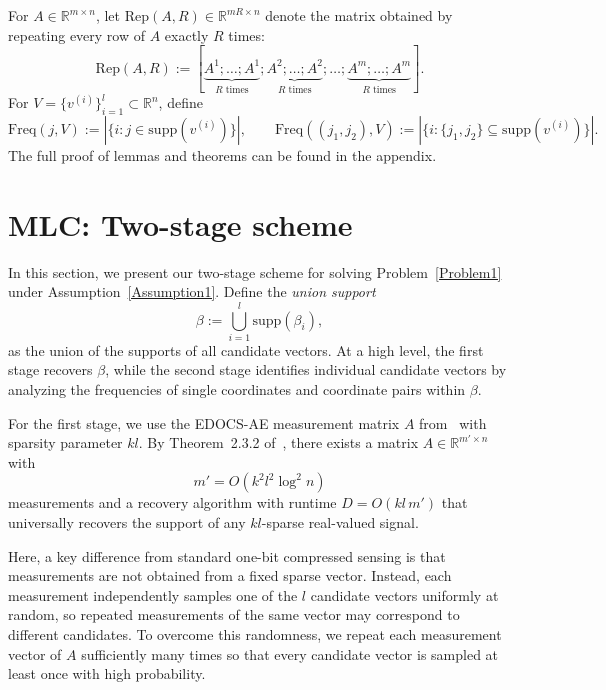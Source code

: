 \documentclass[10pt,a4paper]{amsart}
\newcommand{\xl}[1]{{\color{blue}#1}}
\newcommand{\supp}{\mathrm{supp}}
\begin{document}
For $A\in\mathbb{R}^{m\times n}$, let $\mathrm{Rep}(A,R)\in\mathbb{R}^{mR\times n}$ denote the matrix obtained by repeating every row of $A$ exactly $R$ times:
\[
\mathrm{Rep}(A,R)
:=
[\underbrace{A^1;\dots;A^1}_{R\text{ times}};
\underbrace{A^2;\dots;A^2}_{R\text{ times}};
\dots;
\underbrace{A^m;\dots;A^m}_{R\text{ times}}].
\]
For $V=\{v^{(i)}\}_{i=1}^l\subset\mathbb{R}^n$, define
\[
\mathrm{Freq}(j,V):=
|\{i:j\in\supp(v^{(i)})\}|,
\qquad
\mathrm{Freq}((j_1,j_2),V):=
|\{i:\{j_1,j_2\}\subseteq\supp(v^{(i)})\}|.
\]
The full proof of lemmas and theorems can be found in the appendix.

%




\section{MLC: Two-stage scheme}\label{sec:2SUMLC} 
In this section, we present our two-stage scheme for solving Problem~\ref{Problem1} under Assumption~\ref{Assumption1}. Define the \emph{union support}
\[
\beta:=\bigcup_{i=1}^{l}\supp(\beta_i),
\]
as the union of the supports of all candidate vectors. At a high level, the first stage recovers $\beta$, while the second stage identifies individual candidate vectors by analyzing the frequencies of single coordinates and coordinate pairs within $\beta$.

For the first stage, we use the EDOCS-AE measurement matrix $A$ from~\cite{li2025support} with sparsity parameter $kl$. By Theorem~2.3.2 of~\cite{li2025support}, there exists a matrix $A\in\mathbb{R}^{m'\times n}$ with
\[
m'=O(k^2l^2\log^2 n)
\]
measurements and a recovery algorithm with runtime $D=O(kl\,m')$ that universally recovers the support of any $kl$-sparse real-valued signal.

Here, a key difference from standard one-bit compressed sensing is that measurements are not obtained from a fixed sparse vector. Instead, each measurement independently samples one of the $l$ candidate vectors uniformly at random, so repeated measurements of the same vector may correspond to different candidates. To overcome this randomness, we repeat each measurement vector of $A$ sufficiently many times so that every candidate vector is sampled at least once with high probability.
\end{document}
